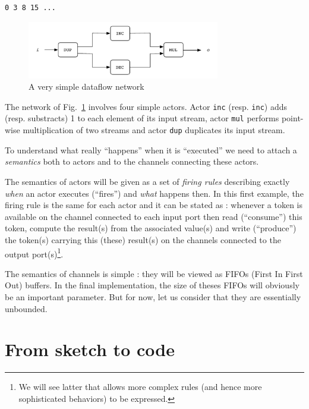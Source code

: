 \begin{verbatim}
0 3 8 15 ...
\end{verbatim}

\begin{figure}[h]
  \centering
  \includegraphics[width=0.75\textwidth]{figs/networkfour}
  \caption{A very simple dataflow network}
  \label{fig:networkfour}
\end{figure}

The network of Fig.~\ref{fig:networkfour} involves four simple actors. Actor \texttt{inc}
(resp. \texttt{inc}) adds (resp. substracts) 1 to each element of its input stream, actor
\texttt{mul} performs point-wise multiplication of two streams and actor \texttt{dup} duplicates its
input stream.

To understand what really ``happens'' when it is ``executed'' we need to attach a
\emph{semantics} both to actors and to the channels connecting these actors.

\medskip
The semantics of actors will be given as a set of \emph{firing rules} describing exactly \emph{when}
an actor executes (``fires'') and \emph{what} happens then. In this first example, the firing rule is the
same for each actor and it can be stated as : whenever a token is available on the channel connected
to each input port then read (``consume'') this token, compute the result(s) from the associated
value(s) and write (``produce'') the token(s) carrying this (these) result(s) on the channels
connected to the output port(s)\footnote{We will see latter that \caph allows more complex rules
  (and hence more sophisticated behaviors) to be expressed.}.

\medskip
The semantics of channels is simple : they will be viewed as FIFOs (First In First Out) buffers. In the
final implementation, the size of theses FIFOs will obviously be an important parameter. But for
now, let us consider that they are essentially unbounded.

\section{From sketch to code}
\label{sec:first-lines-code}

